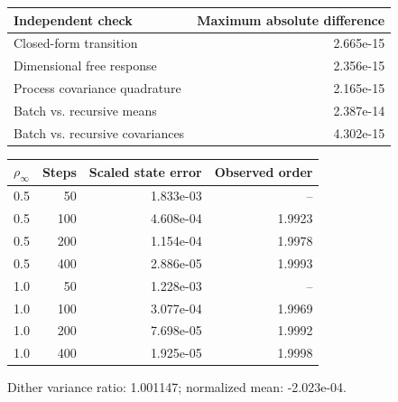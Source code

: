 \begin{center}\small
\begin{tabular}{lr}\toprule
Independent check & Maximum absolute difference\\\midrule
Closed-form transition & 2.665e-15\\
Dimensional free response & 2.356e-15\\
Process covariance quadrature & 2.165e-15\\
Batch vs. recursive means & 2.387e-14\\
Batch vs. recursive covariances & 4.302e-15\\
\bottomrule\end{tabular}
\par\medskip
\begin{tabular}{rrrr}\toprule
$\rho_\infty$ & Steps & Scaled state error & Observed order\\\midrule
0.5 & 50 & 1.833e-03 & --\\
0.5 & 100 & 4.608e-04 & 1.9923\\
0.5 & 200 & 1.154e-04 & 1.9978\\
0.5 & 400 & 2.886e-05 & 1.9993\\
1.0 & 50 & 1.228e-03 & --\\
1.0 & 100 & 3.077e-04 & 1.9969\\
1.0 & 200 & 7.698e-05 & 1.9992\\
1.0 & 400 & 1.925e-05 & 1.9998\\
\bottomrule\end{tabular}
\par Dither variance ratio: 1.001147; normalized mean: -2.023e-04.
\end{center}
